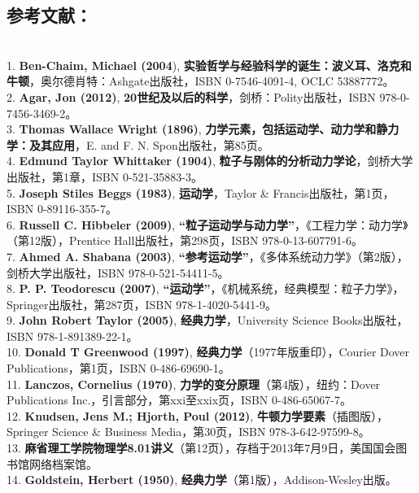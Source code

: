 \subsection{参考文献：}\\
1. \textbf{Ben-Chaim, Michael (2004}), \textbf{实验哲学与经验科学的诞生：波义耳、洛克和牛顿}，奥尔德肖特：Ashgate出版社，ISBN 0-7546-4091-4, OCLC 53887772。\\
2. \textbf{Agar, Jon (2012)}, \textbf{20世纪及以后的科学}，剑桥：Polity出版社，ISBN 978-0-7456-3469-2。\\
3. \textbf{Thomas Wallace Wright (1896)}, \textbf{力学元素，包括运动学、动力学和静力学：及其应用}，E. and F. N. Spon出版社，第85页。\\
4. \textbf{Edmund Taylor Whittaker (1904)}, \textbf{粒子与刚体的分析动力学论}，剑桥大学出版社，第1章，ISBN 0-521-35883-3。\\
5. \textbf{Joseph Stiles Beggs (1983)}, \textbf{运动学}，Taylor & Francis出版社，第1页，ISBN 0-89116-355-7。\\
6. \textbf{Russell C. Hibbeler (2009)}, \textbf{“粒子运动学与动力学”}，《工程力学：动力学》（第12版），Prentice Hall出版社，第298页，ISBN 978-0-13-607791-6。\\
7. \textbf{Ahmed A. Shabana (2003)}, \textbf{“参考运动学”}，《多体系统动力学》（第2版），剑桥大学出版社，ISBN 978-0-521-54411-5。\\
8. \textbf{P. P. Teodorescu (2007)}, \textbf{“运动学”}，《机械系统，经典模型：粒子力学》，Springer出版社，第287页，ISBN 978-1-4020-5441-9。\\
9. \textbf{John Robert Taylor (2005)}, \textbf{经典力学}，University Science Books出版社，ISBN 978-1-891389-22-1。\\
10. \textbf{Donald T Greenwood (1997)}, \textbf{经典力学}（1977年版重印），Courier Dover Publications，第1页，ISBN 0-486-69690-1。\\
11. \textbf{Lanczos, Cornelius (1970)}, \textbf{力学的变分原理}（第4版），纽约：Dover Publications Inc.，引言部分，第xxi至xxix页，ISBN 0-486-65067-7。\\
12. \textbf{Knudsen, Jens M.; Hjorth, Poul (2012)}, \textbf{牛顿力学要素}（插图版），Springer Science & Business Media，第30页，ISBN 978-3-642-97599-8。\\
13. \textbf{麻省理工学院物理学8.01讲义}（第12页），存档于2013年7月9日，美国国会图书馆网络档案馆。\\
14. \textbf{Goldstein, Herbert (1950)}, \textbf{经典力学}（第1版），Addison-Wesley出版。\\
